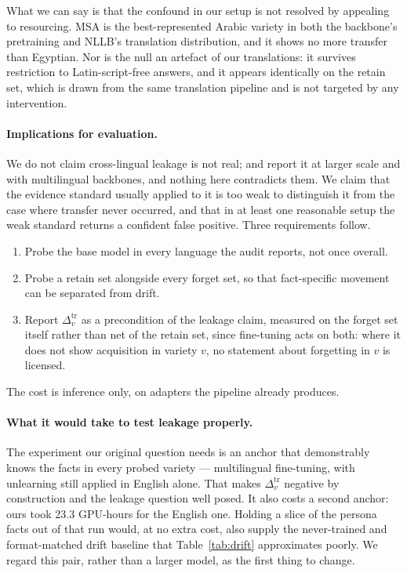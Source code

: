 \documentclass[11pt]{article}
\begin{document}
What we can say is that the confound in our setup is not resolved by
appealing to resourcing. MSA is the best-represented Arabic variety in both
the backbone's pretraining and NLLB's translation distribution, and it shows
no more transfer than Egyptian. Nor is the null an artefact of our
translations: it survives restriction to Latin-script-free answers, and it
appears identically on the retain set, which is drawn from the same
translation pipeline and is not targeted by any intervention.

\paragraph{Implications for evaluation.}
We do not claim cross-lingual leakage is not real; \citet{choi2024crosslingual}
and \citet{farashah2026multilingual} report it at larger scale and with
multilingual backbones, and nothing here contradicts them. We claim that the
evidence standard usually applied to it is too weak to distinguish it from
the case where transfer never occurred, and that in at least one reasonable
setup the weak standard returns a confident false positive. Three
requirements follow.

\begin{enumerate}
  \item Probe the base model in every language the audit reports, not once
overall.
  \item Probe a retain set alongside every forget set, so that fact-specific
movement can be separated from drift.
  \item Report $\Delta_v^{\text{tr}}$ as a precondition of the leakage claim,
measured on the forget set itself rather than net of the retain set, since
fine-tuning acts on both: where it does not show acquisition in variety $v$,
no statement about forgetting in $v$ is licensed.
\end{enumerate}

\noindent The cost is inference only, on adapters the pipeline already
produces.

\paragraph{What it would take to test leakage properly.}
The experiment our original question needs is an anchor that demonstrably
knows the facts in every probed variety — multilingual fine-tuning, with
unlearning still applied in English alone. That makes $\Delta_v^{\text{tr}}$
negative by construction and the leakage question well posed. It also costs
a second anchor: ours took 23.3 GPU-hours for the English one. Holding a
slice of the persona facts out of that run would, at no extra cost, also
supply the never-trained and format-matched drift baseline that
Table~\ref{tab:drift} approximates poorly. We regard this pair, rather than a
larger model, as the first thing to change.
\end{document}
